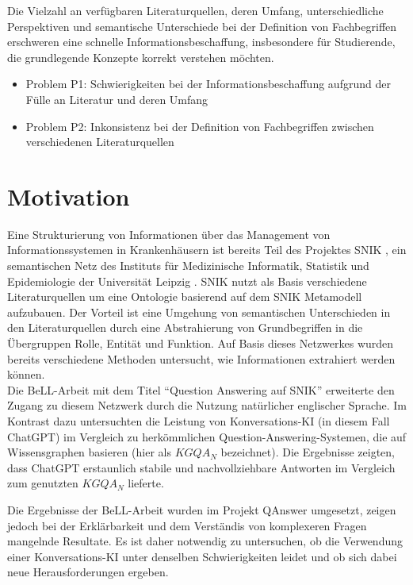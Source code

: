 Die Vielzahl an verfügbaren Literaturquellen, deren Umfang, unterschiedliche Perspektiven und semantische Unterschiede bei der Definition von Fachbegriffen
erschweren eine schnelle Informationsbeschaffung, insbesondere für Studierende, die grundlegende Konzepte korrekt verstehen möchten. \\

\begin{itemize}
  \item Problem P1: Schwierigkeiten bei der Informationsbeschaffung aufgrund der Fülle an Literatur und deren Umfang
  \item Problem P2: Inkonsistenz bei der Definition von Fachbegriffen zwischen verschiedenen Literaturquellen
\end{itemize}

\section{Motivation}

Eine Strukturierung von Informationen über das Management von Informationssystemen in Krankenhäusern ist bereits Teil des Projektes SNIK \citep{snikposter}, 
ein semantischen Netz des Instituts für Medizinische Informatik, Statistik und Epidemiologie der Universität Leipzig \citep{imise}. SNIK nutzt als Basis verschiedene Literaturquellen um eine Ontologie basierend auf dem SNIK Metamodell aufzubauen. 
Der Vorteil ist eine Umgehung von semantischen Unterschieden in den Literaturquellen durch eine Abstrahierung von Grundbegriffen in die Übergruppen Rolle, Entität und Funktion.
Auf Basis dieses Netzwerkes wurden bereits verschiedene Methoden untersucht, wie Informationen extrahiert werden können.\\

Die BeLL-Arbeit mit dem Titel \enquote{Question Answering auf SNIK} \citep{bell_snik} erweiterte den Zugang zu diesem Netzwerk durch die Nutzung natürlicher englischer Sprache. 
Im Kontrast dazu untersuchten \citet{chatgpt_qas} die Leistung von Konversations-KI (in diesem Fall ChatGPT) im Vergleich zu herkömmlichen Question-Answering-Systemen, die auf Wissensgraphen basieren (hier als $KGQA_N$ bezeichnet). 
Die Ergebnisse zeigten, dass ChatGPT erstaunlich stabile und nachvollziehbare Antworten im Vergleich zum genutzten $KGQA_N$ lieferte.

Die Ergebnisse der BeLL-Arbeit wurden im Projekt QAnswer \citep{qanswer} umgesetzt, zeigen jedoch bei der Erklärbarkeit und dem Verständis von komplexeren Fragen mangelnde Resultate. 
Es ist daher notwendig zu untersuchen, ob die Verwendung einer Konversations-KI unter denselben Schwierigkeiten leidet und ob sich dabei neue Herausforderungen ergeben.

